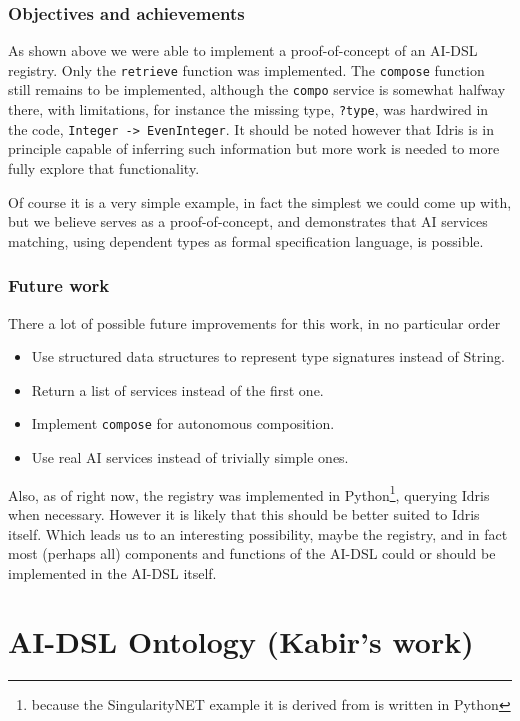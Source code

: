 \documentclass[]{report}
\begin{document}
\subsection{Objectives and achievements}

As shown above we were able to implement a proof-of-concept of an
AI-DSL registry.  Only the \texttt{retrieve} function was implemented.
The \texttt{compose} function still remains to be implemented,
although the \texttt{compo} service is somewhat halfway there, with
limitations, for instance the missing type, \texttt{?type}, was
hardwired in the code, \texttt{Integer -> EvenInteger}.  It should be
noted however that Idris is in principle capable of inferring such
information but more work is needed to more fully explore that
functionality.

Of course it is a very simple example, in fact the simplest we could
come up with, but we believe serves as a proof-of-concept, and
demonstrates that AI services matching, using dependent types as
formal specification language, is possible.

\subsection{Future work}

There a lot of possible future improvements for this work, in no
particular order
\begin{itemize}
\item Use structured data structures to represent type signatures
  instead of String.
\item Return a list of services instead of the first one.
\item Implement \texttt{compose} for autonomous composition.
\item Use real AI services instead of trivially simple ones.
\end{itemize}

Also, as of right now, the registry was implemented in
Python\footnote{because the SingularityNET example it is derived from
is written in Python}, querying Idris when necessary.  However it is
likely that this should be better suited to Idris itself.  Which leads
us to an interesting possibility, maybe the registry, and in fact most
(perhaps all) components and functions of the AI-DSL could or should
be implemented in the AI-DSL itself.

\chapter{AI-DSL Ontology (Kabir's work)}
\end{document}
